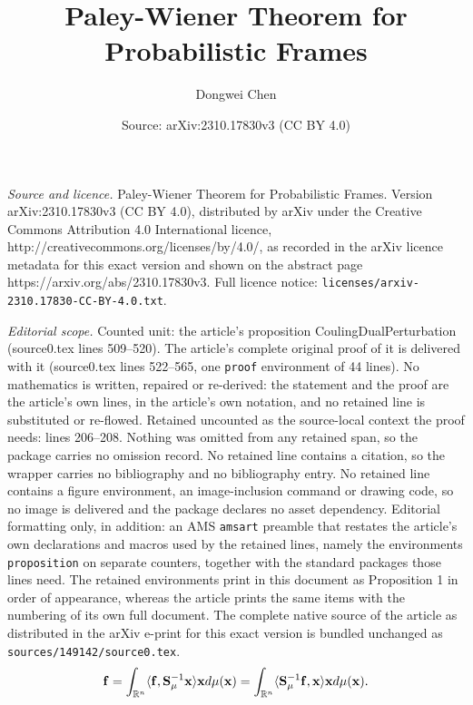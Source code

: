 \documentclass[10pt,a4paper]{amsart}
\title{Paley-Wiener Theorem for Probabilistic Frames}
\author{Dongwei Chen}
\date{Source: arXiv:2310.17830v3 (CC BY 4.0)}
\begin{document}
\maketitle

\noindent\emph{Source and licence.} Paley-Wiener Theorem for Probabilistic Frames. Version arXiv:2310.17830v3 (CC BY 4.0), distributed by arXiv under the Creative Commons Attribution 4.0 International licence, http://creativecommons.org/licenses/by/4.0/, as recorded in the arXiv licence metadata for this exact version and shown on the abstract page https://arxiv.org/abs/2310.17830v3. Full licence notice: \texttt{licenses/arxiv-2310.17830-CC-BY-4.0.txt}.\par\smallskip

\noindent\textit{Editorial scope.} Counted unit: the article's proposition CoulingDualPerturbation (source0.tex lines 509--520). The article's complete original proof of it is delivered with it (source0.tex lines 522--565, one \texttt{proof} environment of 44 lines). No mathematics is written, repaired or re-derived: the statement and the proof are the article's own lines, in the article's own notation, and no retained line is substituted or re-flowed.  Retained uncounted as the source-local context the proof needs: lines 206--208.  Nothing was omitted from any retained span, so the package carries no omission record.  No retained line contains a citation, so the wrapper carries no bibliography and no bibliography entry.  No retained line contains a figure environment, an image-inclusion command or drawing code, so no image is delivered and the package declares no asset dependency.  Editorial formatting only, in addition: an AMS \texttt{amsart} preamble that restates the article's own declarations and macros used by the retained lines, namely the environments \texttt{proposition} on separate counters, together with the standard packages those lines need.  The retained environments print in this document as Proposition 1 in order of appearance, whereas the article prints the same items with the numbering of its own full document.  The complete native source of the article as distributed in the arXiv e-print for this exact version is bundled unchanged as \texttt{sources/149142/source0.tex}.
\begin{equation}\label{reconstruction2}
   {\bf f}=   \int_{\mathbb{R}^n} \langle  {\bf f}, {\bf S}_\mu^{-1} {\bf x} \rangle {\bf x}  d\mu({\bf x}) =\int_{\mathbb{R}^n} \langle  {\bf S}_\mu^{-1} {\bf f}, {\bf x} \rangle {\bf x}  d\mu({\bf x}). 
\end{equation}
\end{document}
